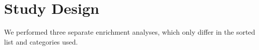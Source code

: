 
\section{Study Design}\label{sec:study_design}
We performed three separate enrichment analyses, which only differ in the sorted list and categories used.
